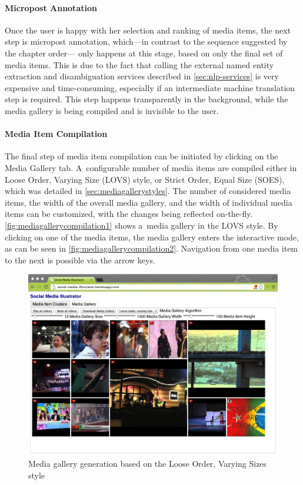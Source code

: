 \paragraph{Micropost Annotation}

Once the user is happy with her selection and ranking of media items,
the next step is micropost annotation,
which---in contrast to the sequence suggested by the chapter order---%
only happens at this stage, based on only the final set of media items.
This is due to the fact that calling the external
named entity extraction and disambiguation services described in
\autoref{sec:nlp-services} is very expensive and time-consuming,
especially if an intermediate machine translation step is required.
This step happens transparently in the background,
while the media gallery is being compiled and is invisible to the user.

\paragraph{Media Item Compilation}

The final step of media item compilation can be initiated
by clicking on the Media Gallery tab.
A~configurable number of media items are compiled either in 
Loose Order, Varying Size (LOVS) style, or 
Strict Order, Equal Size (SOES), which was detailed in 
\autoref{sec:mediagallerystyles}.
The number of considered media items,
the width of the overall media gallery,
and the width of individual media items can be customized,
with the changes being reflected on-the-fly.
\autoref{fig:mediagallerycompilation1} shows a~media gallery
in the LOVS style.
By clicking on one of the media items,
the media gallery enters the interactive mode,
as can be seen in \autoref{fig:mediagallerycompilation2}.
Navigation from one media item to the next is possible via the arrow keys.

\begin{figure}[!ht]
  \centering
  \includegraphics[width=1\columnwidth]{app4.png}
  \caption{Media gallery generation based on the Loose Order, Varying Sizes style}
  \label{fig:mediagallerycompilation1}
\end{figure}

